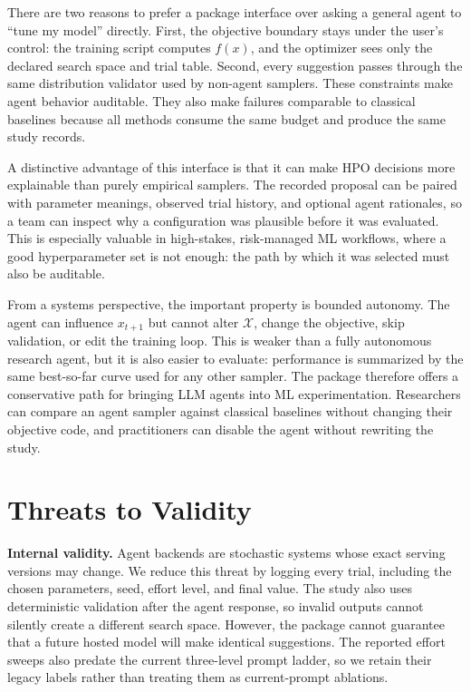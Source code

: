 \documentclass[letterpaper]{article}
\begin{document}
There are two reasons to prefer a package interface over asking a general
agent to ``tune my model'' directly. First, the objective boundary stays under
the user's control: the training script computes $f(x)$, and the optimizer sees
only the declared search space and trial table. Second, every suggestion passes
through the same distribution validator used by non-agent samplers. These
constraints make agent behavior auditable. They also make failures comparable
to classical baselines because all methods consume the same budget and produce
the same study records.

A distinctive advantage of this interface is that it can make HPO decisions
more explainable than purely empirical samplers. The recorded proposal can be
paired with parameter meanings, observed trial history, and optional agent
rationales, so a team can inspect why a configuration was plausible before it
was evaluated. This is especially valuable in high-stakes, risk-managed ML
workflows, where a good hyperparameter set is not enough: the path by which it
was selected must also be auditable.

From a systems perspective, the important property is bounded autonomy. The
agent can influence $x_{t+1}$ but cannot alter $\mathcal{X}$, change the
objective, skip validation, or edit the training loop. This is weaker than a
fully autonomous research agent, but it is also easier to evaluate: performance
is summarized by the same best-so-far curve used for any other sampler. The
package therefore offers a conservative path for bringing LLM agents into ML
experimentation. Researchers can compare an agent sampler against classical
baselines without changing their objective code, and practitioners can disable
the agent without rewriting the study.

\section{Threats to Validity}

\textbf{Internal validity.} Agent backends are stochastic systems whose exact
serving versions may change. We reduce this threat by logging every trial,
including the chosen parameters, seed, effort level, and final value. The study
also uses deterministic validation after the agent response, so invalid outputs
cannot silently create a different search space. However, the package cannot
guarantee that a future hosted model will make identical suggestions. The
reported effort sweeps also predate the current three-level prompt ladder, so we
retain their legacy labels rather than treating them as current-prompt ablations.
\end{document}
